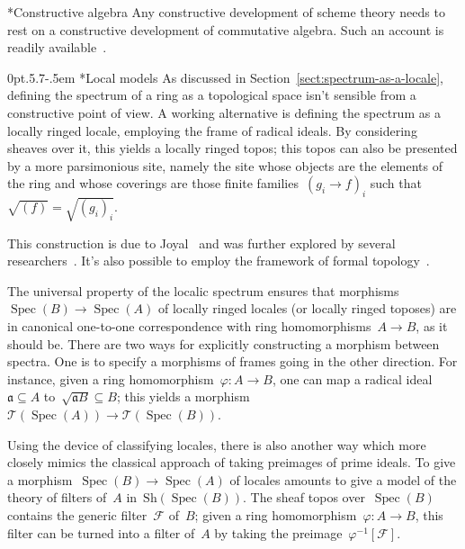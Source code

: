 \documentclass[10pt,reqno,a4paper]{amsbook}
\makeatletter
\theoremstyle{definition}
\theoremstyle{plain}
\theoremstyle{remark}
\newcommand{\F}{\mathcal{F}}
\newcommand{\T}{\mathcal{T}}
\newcommand{\aaa}{\mathfrak{a}}
\newcommand{\Sh}{\mathrm{Sh}}
\DeclareMathOperator{\Spec}{Spec}
\newcommand{\Open}{\T}
\newcommand{\?}{\,{:}\,}
\renewcommand{\_}{\mathpunct{.}\,}
\newcommand{\nocontentsline}[3]{}
\newcommand{\tocless}[1]{\let\addcontentsline=\nocontentsline}
\def\subsection{\@startsection{subsection}{2}%
  {0pt}{.5\linespacing\@plus.7\linespacing}{-.5em}%
  {\normalfont\bfseries}}
\makeatother
\begin{document}
{\tocless

\subsection*{Constructive algebra} Any constructive development of scheme
theory needs to rest on a constructive development of commutative algebra.
Such an account is readily
available~\cite{mines-richman-ruitenburg:constructive-algebra,lombardi:quitte:constructive-algebra}.

\subsection*{Local models} As discussed in
Section~\ref{sect:spectrum-as-a-locale}, defining the spectrum of a ring as a
topological space isn't sensible from a constructive point of view. A working
alternative is defining the spectrum as a locally ringed locale, employing the
frame of radical ideals. By considering sheaves over it, this yields a locally
ringed topos; this topos can also be presented by a more parsimonious site,
namely the site whose objects are the elements of the ring and whose coverings
are those finite families~$(g_i \to f)_i$ such that~$\sqrt{(f)} =
\sqrt{(g_i)_i}$.

This construction is due to
Joyal~\cite{joyal:spectrum,espanol:spectrum,tierney:spectrum} and was further explored
by several researchers~\cite{cls:spectral-schemes,cls:projective-spectrum}.
It's also possible to employ the framework of formal
topology~\cite{schuster:formal-zariski}.

The universal property of the localic spectrum ensures that morphisms~$\Spec(B)
\to \Spec(A)$ of locally ringed locales (or locally ringed toposes) are in
canonical one-to-one correspondence with ring homomorphisms~$A \to B$, as it
should be. There are two ways for explicitly constructing a morphism between
spectra. One is to specify a morphisms of frames going in the other direction.
For instance, given a ring homomorphism~$\varphi : A \to B$, one can map a
radical ideal~$\aaa \subseteq A$ to~$\sqrt{\aaa B} \subseteq B$; this yields a
morphism~$\Open(\Spec(A)) \to \Open(\Spec(B))$.

Using the device of classifying locales, there is also another way which more
closely mimics the classical approach of taking preimages of prime ideals. To
give a morphism~$\Spec(B) \to \Spec(A)$ of locales amounts to give a model of
the theory of filters of~$A$ in~$\Sh(\Spec(B))$. The sheaf topos
over~$\Spec(B)$ contains the generic filter~$\F$ of~$B$; given a ring
homomorphism~$\varphi : A \to B$, this filter can be turned into a filter
of~$A$ by taking the preimage~$\varphi^{-1}[\F]$.

}
\end{document}
